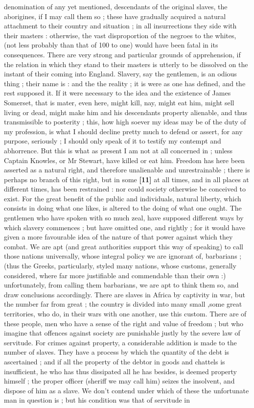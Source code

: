 \documentclass[a4paper]{article}
\begin{document}
denomination of any yet mentioned, descendants of the original slaves, the aborigines, if I may call them so ; these have gradually acquired a natural attachment to their country and situation ; in all insurrections they side with their masters : otherwise, the vast disproportion of the negroes to the whites, (not less probably than that of 100 to one) would have been fatal in its consequences. There are very strong and particular grounds of apprehension, if the relation in which they stand to their masters is utterly to be dissolved on the instant of their coming into England. Slavery, say the gentlemen, is an odious thing ; their name is : and the the reality ; it is were as one has defined, and the rest supposed it. If it were necessary to the idea and the existence of James Somerset, that is mater, even here, might kill, nay, might eat him, might sell living or dead, might make him and his descendants property alienable, and thus transmissible to posterity ; this, how high soever my ideas may be of the duty of my profession, is what I should decline pretty much to defend or assert, for any purpose, seriously ; I should only speak of it to testify my contempt and abhorrence. But this is what as present I am not at all concerned in ; unless Captain Knowles, or Mr Stewart, have killed or eat him. Freedom has here been asserted as a natural right, and therefore unalienable and unrestrainable ; there is perhaps no branch of this right, but in some \textbf{[11]} at all times, and in all places at different times, has been restrained : nor could society otherwise be conceived to exist. For the great benefit of the public and individuals, natural liberty, which consists in doing what one likes, is altered to the doing of what one ought. The gentlemen who have spoken with so much zeal, have supposed different ways by which slavery commences ; but have omitted one, and rightly ; for it would have given a more favourable idea of the nature of that power against which they combat. We are apt (and great authorities support this way of speaking) to call those nations universally, whose integral policy we are ignorant of, barbarians ; (thus the Greeks, particularly, styled many nations, whose customs, generally considered, where far more justifiable and commendable than their own :) unfortunately, from calling them barbarians, we are apt to think them so, and draw conclusions accordingly. There are slaves in Africa by captivity in war, but the number far from great ; the country is divided into many small ,some great territories, who do, in their wars with one another, use this custom. There are of these people, men who have a sense of the right and value of freedom ; but who imagine that offences against society are punishable justly by the severe law of servitude. For crimes against property, a considerable addition is made to the number of slaves. They have a process by which the quantity of the debt is ascertained ; and if all the property of the debtor in goods and chattels is insufficient, he who has thus dissipated all he has besides, is deemed property himself ; the proper officer (sheriff we may call him) seizes the insolvent, and dispose of him as a slave. We don't contend under which of these the unfortunate man in question is ; but his condition was that of servitude in 
\end{document}
